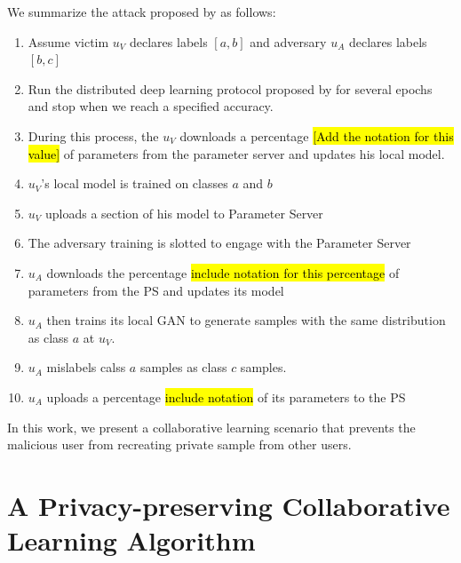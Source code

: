 \documentclass[conference]{IEEEtran}
\begin{document}
We summarize the attack proposed by \cite{hitaj2017deep} as follows:
\begin {enumerate}
\item Assume victim $u_V$ declares labels $[a,b]$ and adversary $u_A$ declares labels $[b,c]$
\item Run the distributed deep learning protocol proposed by \cite{shokri2015privacy} for several epochs and stop when we reach a
specified accuracy.
\item During this process, the $u_V$ downloads a percentage \hl{[Add the notation for this value]} of parameters from the parameter
server and updates his local model.
\item $u_V$'s local model is trained on classes $a$ and $b$
\item $u_V$ uploads a section of his model to Parameter Server
\item The adversary training is slotted to engage with the Parameter Server
\item $u_A$ downloads the percentage \hl{include notation for this percentage} of parameters from the PS and updates its model
\item $u_A$ then trains its local GAN to generate samples with the same distribution as class $a$ at $u_V$.
\item $u_A$  mislabels calss $a$ samples as class $c$ samples.
\item $u_A$ uploads a percentage \hl{include notation} of its parameters to the PS
\end {enumerate}


In this work, we present a collaborative learning scenario that prevents the malicious user from recreating private sample
from other users. 



\section{A Privacy-preserving Collaborative Learning Algorithm}
\end{document}
